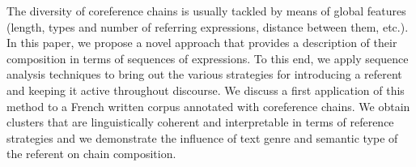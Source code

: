 The diversity of coreference chains is usually tackled by means of global features (length, types and number of referring expressions, distance between them, etc.). In this paper, we propose a novel approach that provides a description of their composition in terms of sequences of expressions. To this end, we apply sequence analysis techniques to bring out the various strategies for introducing a referent and keeping it active throughout discourse. We discuss a first application of this method to a French written corpus annotated with coreference chains. We obtain clusters that are linguistically coherent and interpretable in terms of reference strategies and we demonstrate the influence of text genre and semantic type of the referent on chain composition.
